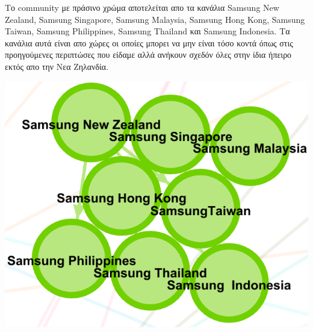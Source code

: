 \documentclass[12pt]{article}
\begin{document}
	\vspace{12pt}
	\vspace{12pt}
	\vspace{12pt}
	\begin{minipage}{0.6\textwidth}
		Το community με πράσινο χρώμα αποτελείται απο τα κανάλια Samsung New Zealand, Samsung Singapore, Samsung Malaysia, Samsung Hong Kong, Samsung Taiwan, Samsung Philippines, Samsung Thailand και Samsung Indonesia. Τα κανάλια αυτά είναι απο χώρες οι οποίες μπορει να μην είναι τόσο κοντά όπως στις προηγούμενες περιπτώσες που είδαμε αλλά ανήκουν σχεδόν όλες στην ίδια ήπειρο εκτός απο την Νεα Ζηλανδία.
	\end{minipage}
	\hspace{0.05\textwidth}
	\begin{minipage}{0.3\textwidth}
		\includegraphics[width=1.0\textwidth]{photos-files/section12/0.1/asia_community.png}
	\end{minipage}
	
	
\end{document}

